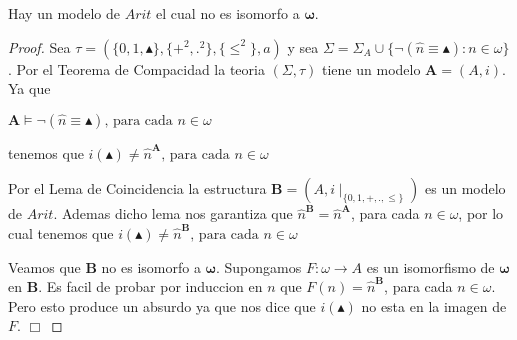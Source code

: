   \begin{proposition} \label{proposition_92}
    \PN Hay un modelo de $Arit$ el cual no es isomorfo a $\mathbf{\omega}$.
  \end{proposition}
  \begin{proof}
    Sea $\tau =(\{0,1,\blacktriangle \},\{+^{2},.^{2}\},\{\leq ^{2}\},a)$ y sea $ \Sigma =\Sigma _{A}\cup \{\lnot (\widehat{n}\equiv \blacktriangle ):n\in \omega \}$. Por el Teorema de Compacidad la teoria $(\Sigma ,\tau )$ tiene un modelo $\mathbf{A}=(A,i)$. Ya que

    $\displaystyle \mathbf{A}\vDash \lnot (\widehat{n}\equiv \blacktriangle )\text{, para cada } n\in \omega $

    tenemos que
    $\displaystyle i(\blacktriangle )\neq \widehat{n}^{\mathbf{A}}\text{, para cada }n\in \omega $

    Por el Lema de Coincidencia la estructura $\mathbf{B}=(A,i\mid _{\{0,1,+,.,\leq \}})$ es un modelo de $Arit$. Ademas dicho lema nos garantiza que $\widehat{n}^{\mathbf{B}}=\widehat{n}^{\mathbf{A}}$, para cada $n\in \omega $, por lo cual tenemos que
    $\displaystyle i(\blacktriangle )\neq \widehat{n}^{\mathbf{B}}\text{, para cada }n\in \omega $

    Veamos que $\mathbf{B}$ no es isomorfo a $\mathbf{\omega }$. Supongamos $ F:\omega \rightarrow A$ es un isomorfismo de $\mathbf{\omega }$ en $\mathbf{B }$. Es facil de probar por induccion en $n$ que $F(n)=\widehat{n}^{\mathbf{B} }$, para cada $n\in \omega $. Pero esto produce un absurdo ya que nos dice que $i(\blacktriangle )$ no esta en la imagen de $F$. $\Box$
  \end{proof}

